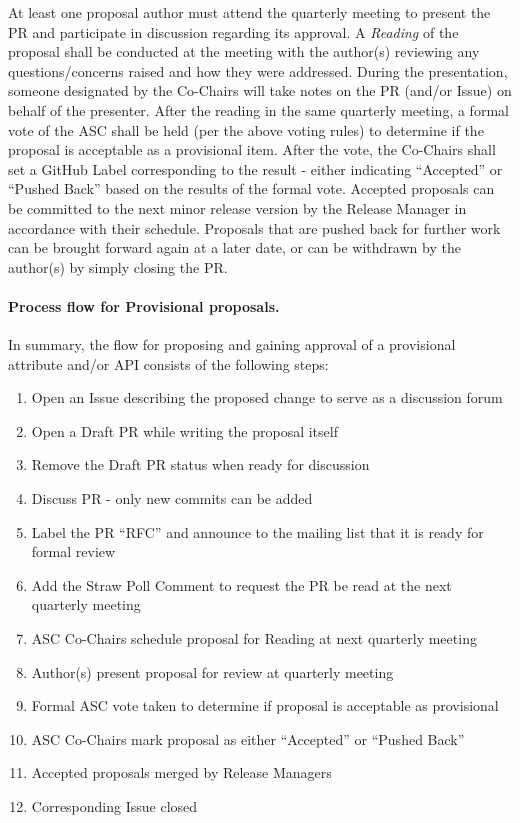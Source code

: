 \documentclass{article}
\providecommand{\tightlist}{%
  \setlength{\itemsep}{0pt}\setlength{\parskip}{0pt}}
\begin{document}
At least one proposal author must attend the quarterly meeting to
present the PR and participate in discussion regarding its approval. A
\textit{Reading} of the proposal shall be conducted at the meeting with the
author(s) reviewing any questions/concerns raised and how they were
addressed. During the presentation, someone designated by the Co-Chairs
will take notes on the PR (and/or Issue) on behalf of the presenter. 
After the reading in the same quarterly meeting, a formal vote of 
the ASC shall be held (per the above voting rules) to determine if
the proposal is acceptable as a provisional item. 
After the vote, the Co-Chairs shall set a GitHub Label corresponding to the
result - either indicating ``Accepted'' or ``Pushed Back'' based on the
results of the formal vote. Accepted proposals can be
committed to the next minor release version by the Release Manager in
accordance with their schedule. Proposals that are pushed back for
further work can be brought forward again at a later date, or can be
withdrawn by the author(s) by simply closing the PR.

\hypertarget{process-flow-for-provisional-proposals}{%
\paragraph{Process flow for Provisional
proposals.}\label{process-flow-for-provisional-proposals}}

In summary, the flow for proposing and gaining approval of a provisional
attribute and/or API consists of the following steps:

\begin{enumerate}
\def\labelenumi{\arabic{enumi}.}
\tightlist
\item
  Open an Issue describing the proposed change to serve as a discussion
  forum
\item
  Open a Draft PR while writing the proposal itself
\item
  Remove the Draft PR status when ready for discussion
\item
  Discuss PR - only new commits can be added
\item
  Label the PR ``RFC'' and announce to the mailing list that it is ready
  for formal review
\item
  Add the Straw Poll Comment to request the PR be read at the
  next quarterly meeting
\item
  ASC Co-Chairs schedule proposal for Reading at next quarterly
  meeting
\item
  Author(s) present proposal for review at quarterly meeting
\item
  Formal ASC vote taken to determine if proposal is acceptable as  provisional 
\item
  ASC Co-Chairs mark proposal as either ``Accepted'' or ``Pushed Back''
\item
  Accepted proposals merged by Release Managers
\item
  Corresponding Issue closed
\end{enumerate}
\end{document}
